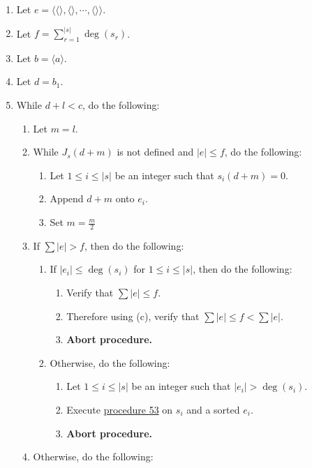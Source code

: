 \documentclass[twocolumn]{article}
\begin{document}
				\begin{enumerate}
					\item Let $e=\langle\langle\rangle,\langle\rangle,\cdots,\langle\rangle\rangle$.
					\item Let $f=\sum_{r=1}^{\lvert s\rvert}\deg(s_r)$.
					\item Let $b=\langle a\rangle$.
					\item Let $d=b_1$.
					\item While $d+l<c$, do the following:
					\begin{enumerate}
						\item Let $m=l$.
						\item While $J_s(d+m)$ is not defined and $\lvert e\rvert\le f$, do the following:
						\begin{enumerate}
							\item Let $1\le i\le\lvert s\rvert$ be an integer such that $s_i(d+m)=0$.
							\item Append $d+m$ onto $e_i$.
							\item Set $m=\frac{m}{2}$
						\end{enumerate}
						\item If $\sum\lvert e\rvert>f$, then do the following:
						\begin{enumerate}
							\item If $\lvert e_i\rvert\le\deg(s_i)$ for $1\le i\le\lvert s\rvert$, then do the following:
							\begin{enumerate}
								\item Verify that $\sum\lvert e\rvert\le f$.
								\item Therefore using (c), verify that $\sum\lvert e\rvert\le f<\sum\lvert e\rvert$.
								\item \textbf{Abort procedure.}
							\end{enumerate}
							\item Otherwise, do the following:
							\begin{enumerate}
								\item Let $1\le i\le\lvert s\rvert$ be an integer such that $\lvert e_i\rvert>\deg(s_i)$.
								\item Execute \hyperref[sec:procedure 53]{procedure 53} on $s_i$ and a sorted $e_i$.
								\item \textbf{Abort procedure.}
							\end{enumerate}
						\end{enumerate}
						\item Otherwise, do the following:

\end{enumerate}
\end{enumerate}
\end{document}
